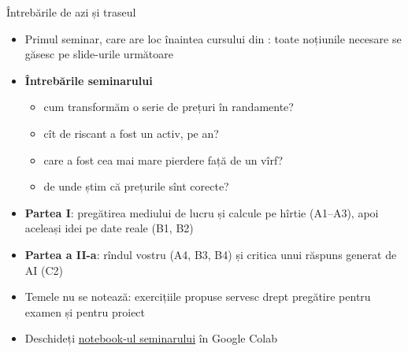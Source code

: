 \begin{frame}{Întrebările de azi și traseul}
\itemsize{\small}
\begin{itemize}
    \item Primul seminar, care are loc înaintea cursului din : toate noțiunile necesare se găsesc pe slide-urile următoare
    \item \textbf{Întrebările seminarului}
    \begin{itemize}
        \item cum transformăm o serie de prețuri în randamente?
        \item cît de riscant a fost un activ, pe an?
        \item care a fost cea mai mare pierdere față de un vîrf?
        \item de unde știm că prețurile sînt corecte?
    \end{itemize}
    \item \textbf{Partea I}: pregătirea mediului de lucru și calcule pe hîrtie (A1--A3), apoi aceleași idei pe date reale (B1, B2)
    
    \item \textbf{Partea a II-a}: rîndul vostru (A4, B3, B4) și critica unui răspuns generat de AI (C2)
    
    \item Temele nu se notează: exercițiile propuse servesc drept pregătire pentru examen și pentru proiect
    \item Deschideți \href{\nb}{notebook-ul seminarului} în Google Colab
\end{itemize}
\end{frame}

